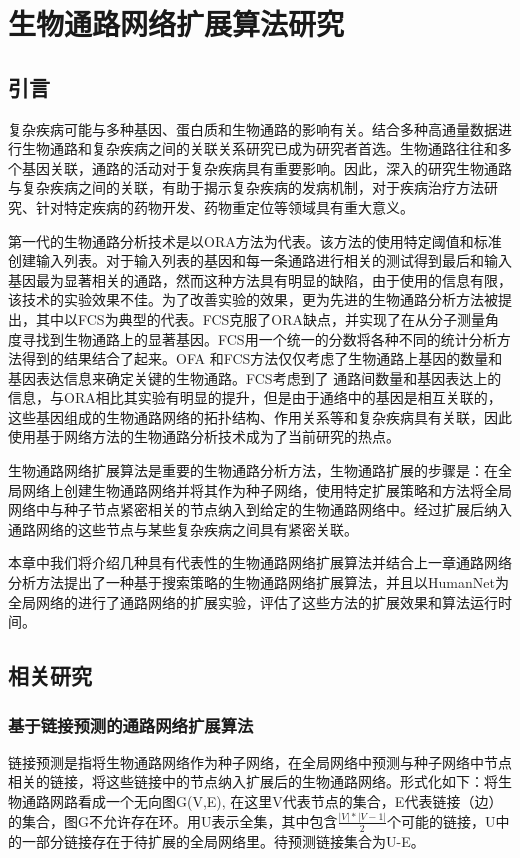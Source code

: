 \chapter{生物通路网络扩展算法研究}
\section{引言}
复杂疾病可能与多种基因、蛋白质和生物通路的影响有关\cite{zhang2016network}。结合多种高通量数据进行生物通路和复杂疾病之间的关联关系研究已成为研究者首选。生物通路往往和多个基因关联，通路的活动对于复杂疾病具有重要影响。因此，深入的研究生物通路与复杂疾病之间的关联，有助于揭示复杂疾病的发病机制，对于疾病治疗方法研究、针对特定疾病的药物开发、药物重定位等领域具有重大意义。

第一代的生物通路分析技术是以ORA\cite{goeman2007analyzing}方法为代表。该方法的使用特定阈值和标准创建输入列表。对于输入列表的基因和每一条通路进行相关的测试得到最后和输入基因最为显著相关的通路，然而这种方法具有明显的缺陷，由于使用的信息有限，该技术的实验效果不佳。为了改善实验的效果，更为先进的生物通路分析方法被提出，其中以FCS\cite{lee2011prioritizing}为典型的代表。FCS克服了ORA缺点，并实现了在从分子测量角度寻找到生物通路上的显著基因。FCS用一个统一的分数将各种不同的统计分析方法得到的结果结合了起来。OFA 和FCS方法仅仅考虑了生物通路上基因的数量和基因表达信息来确定关键的生物通路。FCS\cite{lee2011prioritizing}考虑到了
通路间数量和基因表达上的信息，与ORA相比其实验有明显的提升，但是由于通络中的基因是相互关联的，这些基因组成的生物通路网络的拓扑结构、作用关系等和复杂疾病具有关联，因此使用基于网络方法的生物通路分析技术成为了当前研究的热点。

生物通路网络扩展算法是重要的生物通路分析方法，生物通路扩展的步骤是：在全局网络上创建生物通路网络并将其作为种子网络，使用特定扩展策略和方法将全局网络中与种子节点紧密相关的节点纳入到给定的生物通路网络中。经过扩展后纳入通路网络的这些节点与某些复杂疾病之间具有紧密关联。

本章中我们将介绍几种具有代表性的生物通路网络扩展算法并结合上一章通路网络分析方法提出了一种基于搜索策略的生物通路网络扩展算法，并且以HumanNet为全局网络的进行了通路网络的扩展实验，评估了这些方法的扩展效果和算法运行时间。
\section{相关研究}

\subsection{基于链接预测的通路网络扩展算法}
链接预测是指将生物通路网络作为种子网络，在全局网络中预测与种子网络中节点相关的链接，将这些链接中的节点纳入扩展后的生物通路网络。形式化如下：将生物通路网路看成一个无向图G(V,E), 在这里V代表节点的集合，E代表链接（边）的集合，图G不允许存在环。用U表示全集，其中包含$\frac{|V|*|V-1|}{2}$个可能的链接，U中的一部分链接存在于待扩展的全局网络里。待预测链接集合为U-E。


